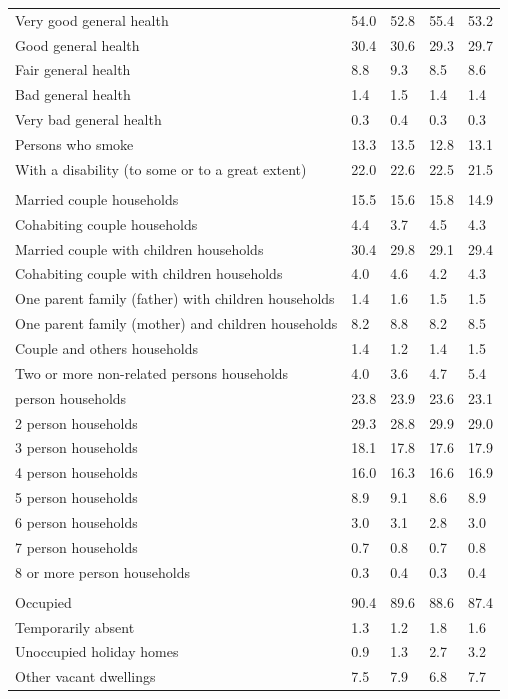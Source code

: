 \documentclass{article}
\begin{document}
\begin{table}[h]
\begin{tabular}{KTTTT}
    \hline
Very good general health & 54.0& 52.8&55.4& 53.2\\
Good general health & 30.4& 30.6& 29.3& 29.7\\
Fair general health & 8.8& 9.3&8.5& 8.6\\
Bad general health & 1.4& 1.5&1.4& 1.4\\
Very bad general health & 0.3& 0.4&0.3& 0.3\\
    \hline
Persons who smoke & 13.3& 13.5&12.8& 13.1\\
    \hline
With a disability (to some or to a great extent) & 22.0& 22.6&22.5& 21.5\\
\hline
    \\ 
    \hline
Married couple households & 15.5& 15.6& 15.8& 14.9\\
Cohabiting couple households & 4.4& 3.7& 4.5& 4.3\\
Married couple with children households & 30.4& 29.8& 29.1& 29.4\\
Cohabiting couple with children households & 4.0& 4.6& 4.2& 4.3\\
One parent family (father) with  children households & 1.4& 1.6& 1.5& 1.5\\
One parent family (mother) and children households & 8.2& 8.8& 8.2& 8.5\\
Couple and others households  & 1.4& 1.2& 1.4& 1.5\\
Two or more non-related persons households & 4.0& 3.6& 4.7& 5.4\\
     person households & 23.8& 23.9& 23.6& 23.1\\
2 person households & 29.3& 28.8& 29.9& 29.0\\
3 person households & 18.1& 17.8& 17.6& 17.9\\
4 person households & 16.0& 16.3& 16.6& 16.9\\
5 person households & 8.9& 9.1& 8.6& 8.9\\
6 person households & 3.0& 3.1& 2.8& 3.0\\
7 person households & 0.7& 0.8& 0.7& 0.8\\
8 or more person households & 0.3& 0.4& 0.3& 0.4\\
\hline
    \\ 
    \hline
Occupied & 90.4& 89.6& 88.6& 87.4\\
Temporarily absent & 1.3& 1.2& 1.8& 1.6\\
Unoccupied holiday homes & 0.9& 1.3& 2.7& 3.2\\
Other vacant dwellings & 7.5& 7.9& 6.8& 7.7\\
\hline
\end{tabular}
\end{table}
\end{document}
